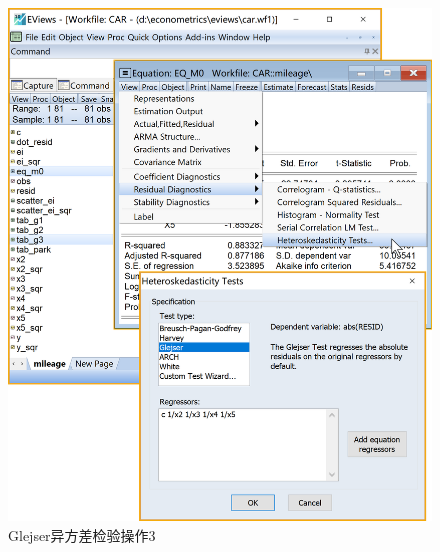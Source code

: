 \documentclass[12pt,(landscape,a4paper),(portrait,a4paper)]{article}
\begin{document}
\begin{figure}

{\centering \includegraphics[width=24.11in]{picture/lab6-heteroskedasticity/4-test-G3-1} 

}

\caption{Glejser异方差检验操作3}\label{fig:fig-G3-test}
\end{figure}
\end{document}
